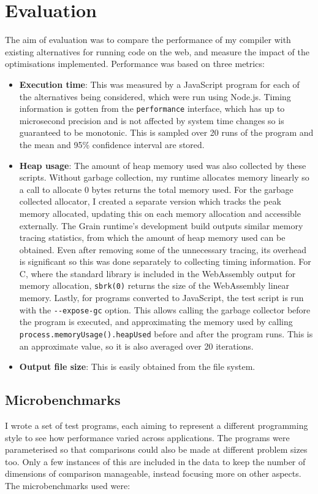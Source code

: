 \chapter{Evaluation}
The aim of evaluation was to compare the performance of my compiler with existing alternatives for running code on the web, and measure the impact of the optimisations implemented. Performance was based on three metrics: 

\begin{itemize}
\item \textbf{Execution time}: This was measured by a JavaScript program for each of the alternatives being considered, which were run using Node.js. Timing information is gotten from the \verb|performance| interface, which has up to microsecond precision and is not affected by system time changes so is guaranteed to be monotonic. This is sampled over 20 runs of the program and the mean and 95\% confidence interval are stored. \\
\item \textbf{Heap usage}: The amount of heap memory used was also collected by these scripts. Without garbage collection, my runtime allocates memory linearly so a call to allocate 0 bytes returns the total memory used. For the garbage collected allocator, I created a separate version which tracks the peak memory allocated, updating this on each memory allocation and accessible externally. 
The Grain runtime's development build outputs similar memory tracing statistics, from which the amount of heap memory used can be obtained. Even after removing some of the unnecessary tracing, its overhead is significant so this was done separately to collecting timing information. For C, where the standard library is included in the WebAssembly output for memory allocation, \verb|sbrk(0)| returns the size of the WebAssembly linear memory. Lastly, for programs converted to JavaScript, the test script is run with the \verb|--expose-gc| option. This allows calling the garbage collector before the program is executed, and approximating the memory used by calling \verb|process.memoryUsage().heapUsed| before and after the program runs. This is an approximate value, so it is also averaged over 20 iterations.
\item \textbf{Output file size}: This is easily obtained from the file system.

\end{itemize}


\section{Microbenchmarks}
I wrote a set of test programs, each aiming to represent a different programming style to see how performance varied across applications. The programs were parameterised so that comparisons could also be made at different problem sizes too. Only a few instances of this are included in the data to keep the number of dimensions of comparison manageable, instead focusing more on other aspects. The microbenchmarks used were:

